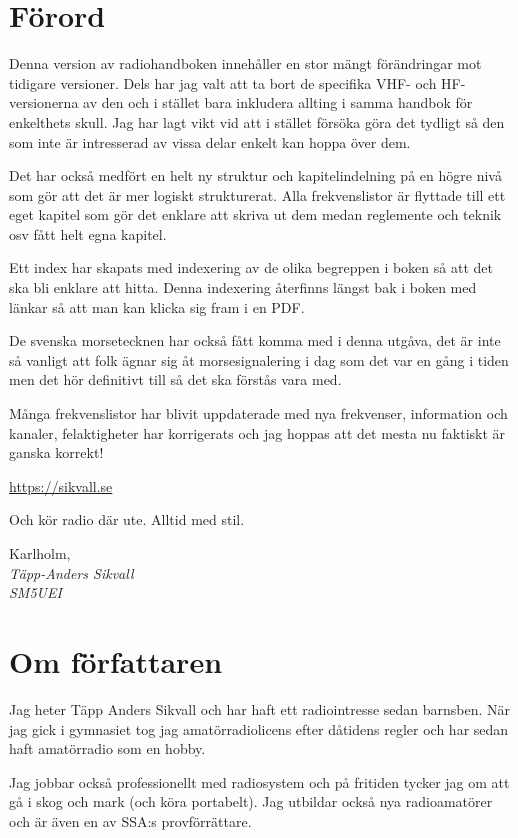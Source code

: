 \section*{Förord}

Denna version av radiohandboken innehåller en stor mängt förändringar mot
tidigare versioner. Dels har jag valt att ta bort de specifika VHF- och
HF-versionerna av den och i stället bara inkludera allting i samma handbok för
enkelthets skull. Jag har lagt vikt vid att i stället försöka göra det tydligt
så den som inte är intresserad av vissa delar enkelt kan hoppa över dem.

Det har också medfört en helt ny struktur och kapitelindelning på en högre
nivå som gör att det är mer logiskt strukturerat. Alla frekvenslistor är
flyttade till ett eget kapitel som gör det enklare att skriva ut dem medan
reglemente och teknik osv fått helt egna kapitel.

Ett index har skapats med indexering av de olika begreppen i boken så att det
ska bli enklare att hitta. Denna indexering återfinns längst bak i boken med
länkar så att man kan klicka sig fram i en PDF.

De svenska morsetecknen har också fått komma med i denna utgåva, det
är inte så vanligt att folk ägnar sig åt morsesignalering i dag som
det var en gång i tiden men det hör definitivt till så det ska förstås
vara med.

Många frekvenslistor har blivit uppdaterade med nya frekvenser, information
och kanaler, felaktigheter har korrigerats och jag hoppas att det mesta nu
faktiskt är ganska korrekt!

\url{https://sikvall.se}

Och kör radio där ute. Alltid med stil.

\vspace{4mm}

Karlholm, \DokumentDatum\\
\textit{Täpp-Anders Sikvall\\
	SM5UEI}

\section*{Om författaren}

Jag heter Täpp Anders Sikvall och har haft ett radiointresse sedan
barnsben. När jag gick i gymnasiet tog jag amatörradiolicens efter dåtidens
regler och har sedan haft amatörradio som en hobby.

Jag jobbar också professionellt med radiosystem och på fritiden tycker jag om
att gå i skog och mark (och köra portabelt). Jag utbildar också nya
radioamatörer och är även en av SSA:s provförrättare.

